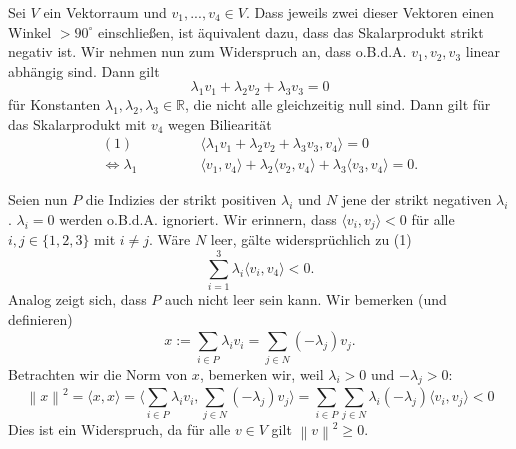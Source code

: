 \begin{figure}
\vspace{-10px}
\end{figure}

Sei $V$ ein Vektorraum und $v_1, ..., v_4 \in V$. Dass jeweils zwei dieser Vektoren
einen Winkel $>90^{\circ}$ einschlie\ss en, ist äquivalent dazu, dass das Skalarprodukt strikt negativ ist.
Wir nehmen nun zum Widerspruch an, dass o.B.d.A. $v_1, v_2, v_3$ linear abhängig sind. Dann gilt \[\lambda_1v_1 + \lambda_2v_2 + \lambda_3v_3 = 0\]
für Konstanten $\lambda_1, \lambda_2, \lambda_3 \in \mathbb R$, die nicht alle gleichzeitig null sind.
Dann gilt für das Skalarprodukt mit $v_4$ wegen Biliearität
\begin{align*}
    (1) \qquad \qquad &\langle \lambda_1v_1 + \lambda_2v_2 + \lambda_3v_3, v_4 \rangle = 0\\
    \Longleftrightarrow \lambda_1&\langle v_1, v_4\rangle + \lambda_2\langle v_2, v_4\rangle +\lambda_3\langle v_3, v_4\rangle = 0.
\end{align*}
    
Seien nun $P$ die Indizies der strikt positiven $\lambda_i$ und $N$ jene der strikt negativen $\lambda_i$. $\lambda_i = 0$ werden o.B.d.A. ignoriert.
Wir erinnern, dass $\langle v_i, v_j\rangle < 0$ für alle $i,j \in \{1,2,3\}$ mit $i \neq j$. Wäre $N$ leer, gälte widersprüchlich zu (1)
\[
    \sum_{i=1}^{3}\lambda_i\langle v_i, v_4\rangle < 0.
\]
Analog zeigt sich, dass $P$ auch nicht leer sein kann. Wir bemerken (und definieren)
\[
    x:=\sum_{i \in P}^{}\lambda_iv_i = \sum_{j \in N}^{}(-\lambda_j)v_j. %
\]
Betrachten wir die Norm von $x$, bemerken wir, weil $\lambda_i > 0$ und $-\lambda_j > 0$:
\[
    \left\| x\right\|^2 = \langle x, x\rangle = \langle \sum_{i \in P}^{}\lambda_iv_i, \sum_{j \in N}^{}(-\lambda_j)v_j\rangle= \sum_{i \in P}^{}\sum_{j \in N}^{}\lambda_i(-\lambda_j)\langle v_i, v_j\rangle < 0
\]
Dies ist ein Widerspruch, da für alle $v \in V$ gilt $\left\|v\right\|^2 \geq 0$.